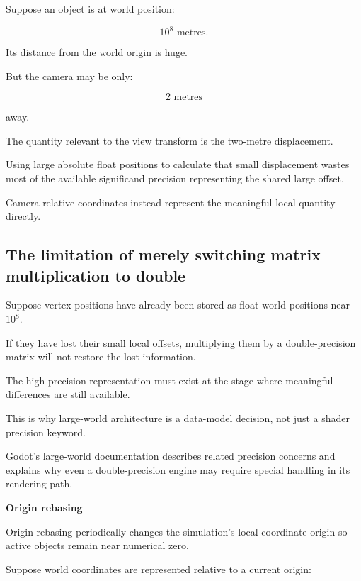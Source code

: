 \hypertarget{02-foundations-ii-ch036-difference-between-absolute-and-relative-accuracy}{}

Suppose an object is at world position:

\[
 10^8\text{ metres}.
\]

Its distance from the world origin is huge.

But the camera may be only:

\[
 2\text{ metres}
\]

away.

The quantity relevant to the view transform is the two-metre displacement.

Using large absolute float positions to calculate that small displacement wastes most of the available significand precision representing the shared large offset.

Camera-relative coordinates instead represent the meaningful local quantity directly.

\subsection{The limitation of merely switching matrix multiplication to double}\label{02-foundations-ii-ch036-the-limitation-of-merely-switching-matrix-multiplication-to-double}

\hypertarget{02-foundations-ii-ch036-the-limitation-of-merely-switching-matrix-multiplication-to-double}{}

Suppose vertex positions have already been stored as float world positions near \(10^8\).

If they have lost their small local offsets, multiplying them by a double-precision matrix will not restore the lost information.

The high-precision representation must exist at the stage where meaningful differences are still available.

This is why large-world architecture is a data-model decision, not just a shader precision keyword.

Godot's large-world documentation describes related precision concerns and explains why even a double-precision engine may require special handling in its rendering path. 

\textbf{Origin rebasing}

Origin rebasing periodically changes the simulation's local coordinate origin so active objects remain near numerical zero.

Suppose world coordinates are represented relative to a current origin:

